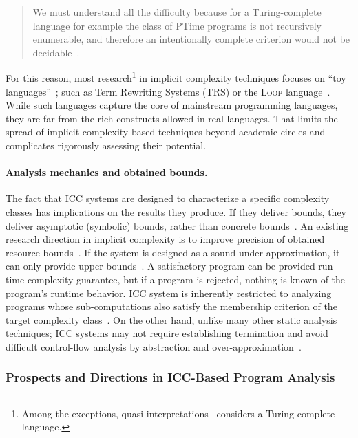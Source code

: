 \begin{quotation}
    \noindent We must understand all the diﬃculty because for a Turing-complete language for example the class of PTime programs is not recursively enumerable, and therefore an intentionally complete criterion would not be decidable~\cite[Sect. 4.1]{mogbil2012}.
\end{quotation}

\noindent For this reason, most research\footnote{
    Among the exceptions, quasi-interpretations~\cite{marion2000} considers a Turing-complete language.}
in implicit complexity techniques focuses on \enquote{toy languages}~\cite{moyen2017,rubiano17};
such as Term Rewriting Systems (TRS) or the \textsc{Loop} language~\cite{kristiansen2005}.
While such languages capture the core of mainstream programming languages, they are far from the rich constructs allowed in real languages.
That limits the spread of implicit complexity-based techniques beyond academic circles and complicates rigorously assessing their potential.

\paragraph*{Analysis mechanics and obtained bounds.}
The fact that ICC systems are designed to characterize a specific complexity classes has implications on the results they produce.
If they deliver bounds, they deliver asymptotic (symbolic) bounds, rather than concrete bounds~\cite{baillot2019}.
An existing research direction in implicit complexity is to improve precision of obtained resource bounds~\cite{benamram2020}.
If the system is designed as a sound under-approximation, it can only provide upper bounds~\cite[p. 119]{moyen2017}.
A satisfactory program can be provided run-time complexity guarantee,
but if a program is rejected, nothing is known of the program's runtime behavior.
ICC system is inherently restricted to analyzing programs whose sub-computations also satisfy the membership criterion of the target complexity class~\cite{baillot2019}.
On the other hand, unlike many other static analysis techniques;
ICC systems may not require establishing termination and avoid difficult control-flow analysis by abstraction and over-approximation~\cite{jones2009}.

\subsubsection{Prospects and Directions in ICC-Based Program Analysis}

